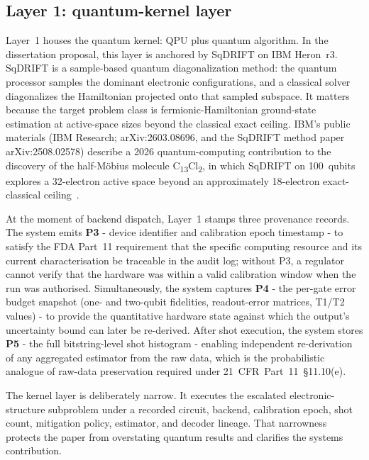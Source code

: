 \documentclass[11pt,letterpaper]{article}
\begin{document}
\subsection{Layer 1: quantum-kernel layer}
\label{sec:layer1}

Layer~1 houses the quantum kernel: QPU plus quantum algorithm.  In the dissertation proposal,
this layer is anchored by SqDRIFT on IBM Heron~r3.  SqDRIFT is a sample-based quantum
diagonalization method: the quantum processor samples the dominant electronic configurations,
and a classical solver diagonalizes the Hamiltonian projected onto that sampled subspace.  It
matters because the target problem class is fermionic-Hamiltonian ground-state estimation at
active-space sizes beyond the classical exact ceiling.  IBM's
public materials (IBM Research; arXiv:2603.08696, and the SqDRIFT method paper
arXiv:2508.02578) describe a 2026 quantum-computing contribution to the discovery of the
half-M\"obius molecule C\textsubscript{13}Cl\textsubscript{2}, in which SqDRIFT on 100~qubits
explores a 32-electron active space beyond an approximately 18-electron exact-classical
ceiling~\cite{ibm2026molecule,qcreport2026}.

At the moment of backend dispatch, Layer~1 stamps three provenance records.  The system emits
\textbf{P3} - device identifier and calibration epoch timestamp - to satisfy the FDA Part~11
requirement that the specific computing resource and its current characterisation be traceable
in the audit log; without P3, a regulator cannot verify that the hardware was within a valid
calibration window when the run was authorised.  Simultaneously, the system captures
\textbf{P4} - the per-gate error budget snapshot (one- and two-qubit fidelities, readout-error
matrices, T1/T2 values) - to provide the quantitative hardware state against which the
output's uncertainty bound can later be re-derived.  After shot execution, the system stores
\textbf{P5} - the full bitstring-level shot histogram - enabling independent re-derivation
of any aggregated estimator from the raw data, which is the probabilistic analogue of raw-data
preservation required under 21~CFR~Part~11~\S{}11.10(e).

The kernel layer is deliberately narrow.  It executes the escalated electronic-structure
subproblem under a recorded circuit, backend, calibration epoch, shot count, mitigation
policy, estimator, and decoder lineage.  That narrowness protects the paper from overstating
quantum results and clarifies the systems contribution.
\end{document}
